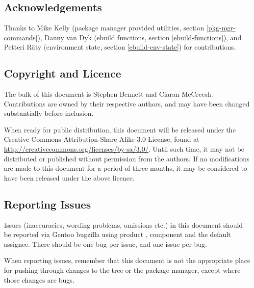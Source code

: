 \chapter*{}

\section*{Acknowledgements}

Thanks to Mike Kelly (package manager provided utilities, section \ref{pkg-mgr-commands}),
Danny van Dyk (ebuild functions, section \ref{ebuild-functions}), and
Petteri R\"aty (environment state, section \ref{ebuild-env-state}) for contributions.

\section*{Copyright and Licence}

The bulk of this document is  Stephen Bennett and Ciaran McCreesh. Contributions
are owned by their respective authors, and may have been changed substantially before inclusion.

When ready for public distribution, this document will be released under the Creative Commons
Attribution-Share Alike 3.0 License, found at \url{http://creativecommons.org/licenses/by-sa/3.0/}.
Until such time, it may not be distributed or published without permission from the authors. If no
modifications are made to this document for a period of three months, it may be considered to have
been released under the above licence.

\section*{Reporting Issues}

Issues (inaccuracies, wording problems, omissions etc.) in this document should be reported via
Gentoo bugzilla using product , component  and the default
assignee. There should be one bug per issue, and one issue per bug.

When reporting issues, remember that this document is not the appropriate place for pushing
through changes to the tree or the package manager, except where those changes are bugs.


